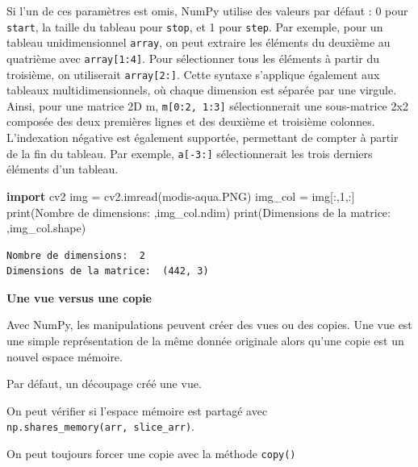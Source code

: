 \documentclass[
]{article}
\newenvironment{Shaded}{}{}
\newcommand{\BuiltInTok}[1]{\textcolor[rgb]{0.00,0.50,0.00}{#1}}
\newcommand{\DecValTok}[1]{\textcolor[rgb]{0.25,0.63,0.44}{#1}}
\newcommand{\ImportTok}[1]{\textcolor[rgb]{0.00,0.50,0.00}{\textbf{#1}}}
\newcommand{\NormalTok}[1]{#1}
\newcommand{\OperatorTok}[1]{\textcolor[rgb]{0.40,0.40,0.40}{#1}}
\newcommand{\StringTok}[1]{\textcolor[rgb]{0.25,0.44,0.63}{#1}}
\begin{document}
Si l'un de ces paramètres est omis, NumPy utilise des valeurs par défaut
: 0 pour \texttt{start}, la taille du tableau pour \texttt{stop}, et 1
pour \texttt{step}. Par exemple, pour un tableau unidimensionnel
\texttt{array}, on peut extraire les éléments du deuxième au quatrième
avec \texttt{array{[}1:4{]}}. Pour sélectionner tous les éléments à
partir du troisième, on utiliserait \texttt{array{[}2:{]}}. Cette
syntaxe s'applique également aux tableaux multidimensionnels, où chaque
dimension est séparée par une virgule. Ainsi, pour une matrice 2D m,
\texttt{m{[}0:2,\ 1:3{]}} sélectionnerait une sous-matrice 2x2 composée
des deux premières lignes et des deuxième et troisième colonnes.
L'indexation négative est également supportée, permettant de compter à
partir de la fin du tableau. Par exemple, \texttt{a{[}-3:{]}}
sélectionnerait les trois derniers éléments d'un tableau.

\label{b3549f48}
\label{cb10}
\begin{Shaded}
\begin{Highlighting}[]
\ImportTok{import}\NormalTok{ cv2}
\NormalTok{img }\OperatorTok{=}\NormalTok{ cv2.imread(}\StringTok{\textquotesingle{}modis{-}aqua.PNG\textquotesingle{}}\NormalTok{)}
\NormalTok{img\_col }\OperatorTok{=}\NormalTok{ img[:,}\DecValTok{1}\NormalTok{,:]}
\BuiltInTok{print}\NormalTok{(}\StringTok{\textquotesingle{}Nombre de dimensions: \textquotesingle{}}\NormalTok{,img\_col.ndim)}
\BuiltInTok{print}\NormalTok{(}\StringTok{\textquotesingle{}Dimensions de la matrice: \textquotesingle{}}\NormalTok{,img\_col.shape)}
\end{Highlighting}
\end{Shaded}

\begin{verbatim}
Nombre de dimensions:  2
Dimensions de la matrice:  (442, 3)
\end{verbatim}

\textbf{Une vue versus une copie}

Avec NumPy, les manipulations peuvent créer des vues ou des copies. Une
vue est une simple représentation de la même donnée originale alors
qu'une copie est un nouvel espace mémoire.

Par défaut, un découpage créé une vue.

On peut vérifier si l'espace mémoire est partagé avec
\texttt{np.shares\_memory(arr,\ slice\_arr)}.

On peut toujours forcer une copie avec la méthode \texttt{copy()}
\end{document}
